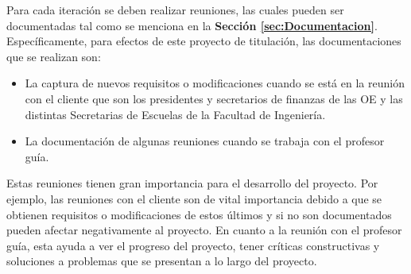 Para cada iteración se deben realizar reuniones, las cuales pueden ser documentadas tal como se menciona en la \textbf{Sección \ref{sec:Documentacion}}. Específicamente, para efectos de este proyecto de titulación, las documentaciones que se realizan son:

\begin{itemize}
    \item La captura de nuevos requisitos o modificaciones cuando se está en la reunión con el cliente que son los presidentes y secretarios de finanzas de las OE y las distintas Secretarias de Escuelas de la Facultad de Ingeniería.
    \item La documentación de algunas reuniones cuando se trabaja con el profesor guía.
\end{itemize} 

Estas reuniones tienen gran importancia para el desarrollo del proyecto. Por ejemplo, las reuniones con el cliente son de vital importancia debido a que se obtienen requisitos o modificaciones de estos últimos y si no son documentados pueden afectar negativamente al proyecto. En cuanto a la reunión con el profesor guía, esta ayuda a ver el progreso del proyecto, tener críticas constructivas y soluciones a problemas que se presentan a lo largo del proyecto.
